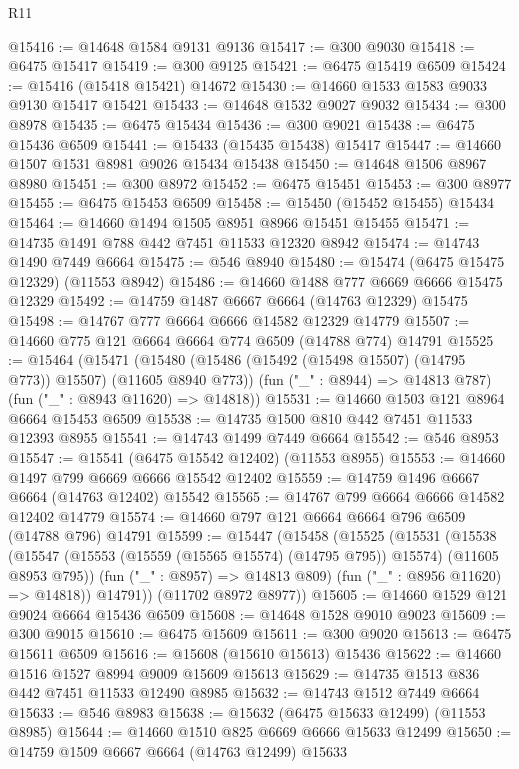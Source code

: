 \begin{lexlean}{R11}
\begin{coremodule}
{{{{{{{{{{{{{{{{{{{{{{{{{{{{{{{{{{{{{{{{{{{{{{{{{{{{{{{{{{{{{{{{{{{{{{{{{{{{{{{{{{@15416 := @14648 @1584 @9131 @9136
@15417 := @300 @9030
@15418 := @6475 @15417
@15419 := @300 @9125
@15421 := @6475 @15419 @6509
@15424 := @15416 (@15418 @15421) @14672
@15430 := @14660 @1533 @1583 @9033 @9130 @15417 @15421
@15433 := @14648 @1532 @9027 @9032
@15434 := @300 @8978
@15435 := @6475 @15434
@15436 := @300 @9021
@15438 := @6475 @15436 @6509
@15441 := @15433 (@15435 @15438) @15417
@15447 := @14660 @1507 @1531 @8981 @9026 @15434 @15438
@15450 := @14648 @1506 @8967 @8980
@15451 := @300 @8972
@15452 := @6475 @15451
@15453 := @300 @8977
@15455 := @6475 @15453 @6509
@15458 := @15450 (@15452 @15455) @15434
@15464 := @14660 @1494 @1505 @8951 @8966 @15451 @15455
@15471 := @14735 @1491 @788 @442 @7451 @11533 @12320 @8942
@15474 := @14743 @1490 @7449 @6664
@15475 := @546 @8940
@15480 := @15474 (@6475 @15475 @12329) (@11553 @8942)
@15486 := @14660 @1488 @777 @6669 @6666 @15475 @12329
@15492 := @14759 @1487 @6667 @6664 (@14763 @12329) @15475
@15498 := @14767 @777 @6664 @6666 @14582 @12329 @14779
@15507 := @14660 @775 @121 @6664 @6664 @774 @6509 (@14788 @774) @14791
@15525 := @15464
    (@15471
      (@15480 (@15486 (@15492 (@15498 @15507) (@14795 @773)) @15507) (@11605 @8940 @773))
      (fun ("_" : @8944) => @14813 @787)
      (fun ("_" : @8943 @11620) => @14818))
@15531 := @14660 @1503 @121 @8964 @6664 @15453 @6509
@15538 := @14735 @1500 @810 @442 @7451 @11533 @12393 @8955
@15541 := @14743 @1499 @7449 @6664
@15542 := @546 @8953
@15547 := @15541 (@6475 @15542 @12402) (@11553 @8955)
@15553 := @14660 @1497 @799 @6669 @6666 @15542 @12402
@15559 := @14759 @1496 @6667 @6664 (@14763 @12402) @15542
@15565 := @14767 @799 @6664 @6666 @14582 @12402 @14779
@15574 := @14660 @797 @121 @6664 @6664 @796 @6509 (@14788 @796) @14791
@15599 := @15447
    (@15458
      (@15525
        (@15531
          (@15538
            (@15547 (@15553 (@15559 (@15565 @15574) (@14795 @795)) @15574) (@11605 @8953 @795))
            (fun ("_" : @8957) => @14813 @809)
            (fun ("_" : @8956 @11620) => @14818))
          @14791))
      (@11702 @8972 @8977))
@15605 := @14660 @1529 @121 @9024 @6664 @15436 @6509
@15608 := @14648 @1528 @9010 @9023
@15609 := @300 @9015
@15610 := @6475 @15609
@15611 := @300 @9020
@15613 := @6475 @15611 @6509
@15616 := @15608 (@15610 @15613) @15436
@15622 := @14660 @1516 @1527 @8994 @9009 @15609 @15613
@15629 := @14735 @1513 @836 @442 @7451 @11533 @12490 @8985
@15632 := @14743 @1512 @7449 @6664
@15633 := @546 @8983
@15638 := @15632 (@6475 @15633 @12499) (@11553 @8985)
@15644 := @14660 @1510 @825 @6669 @6666 @15633 @12499
@15650 := @14759 @1509 @6667 @6664 (@14763 @12499) @15633
}}}}}}}}}}}}}}}}}}}}}}}}}}}}}}}}}}}}}}}}}}}}}}}}}}}}}}}}}}}}}}}}}}}}}}}}}}}}}}}}}}
\end{coremodule}
\end{lexlean}
